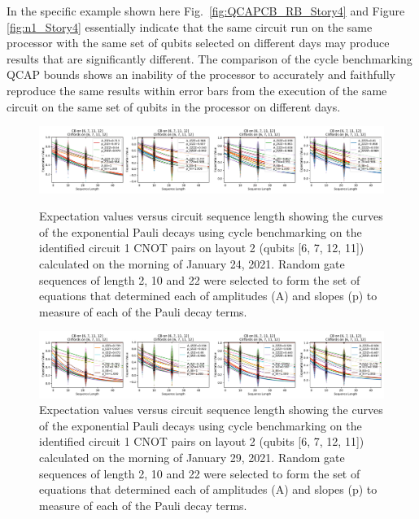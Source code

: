 In the specific example shown here Fig.~\ref{fig:QCAPCB_RB_Story4} 
and Figure \ref{fig:n1_Story4} essentially indicate that the same circuit run on the same processor with the same set of qubits selected on different days may produce results that are significantly different.  The comparison of the cycle benchmarking QCAP bounds shows an inability of the processor to accurately and faithfully reproduce the same results within error bars from the execution of the same circuit on the same set of qubits in the processor on different days.   



\begin{figure}[htpb]

    \includegraphics[scale=0.37]{4-CBRawData_24_01_2021_MorningRun_Layout2.pdf}
    \caption{Expectation values versus circuit sequence length showing the curves of the exponential Pauli decays using cycle benchmarking on the identified circuit 1 CNOT pairs on layout 2 (qubits [6, 7, 12, 11]) calculated on the morning of January 24, 2021.  Random gate sequences of length 2, 10 and 22 were selected to form the set of equations that determined each of amplitudes (A) and slopes (p) to measure of each of the Pauli decay terms.}
    \label{fig:CBRaw-1-24-2021}

    \includegraphics[scale=0.37]{4-CBRawData_29_01_2021_MorningRun_Layout2.pdf}
    \caption{Expectation values versus circuit sequence length showing the curves of the exponential Pauli decays using cycle benchmarking on the identified circuit 1 CNOT pairs on layout 2 (qubits [6, 7, 12, 11]) calculated on the morning of January 29, 2021.  Random gate sequences of length 2, 10 and 22 were selected to form the set of equations that determined each of amplitudes (A) and slopes (p) to measure of each of the Pauli decay terms.}
    \label{fig:CBRaw-1-29-2021}


\end{figure}
